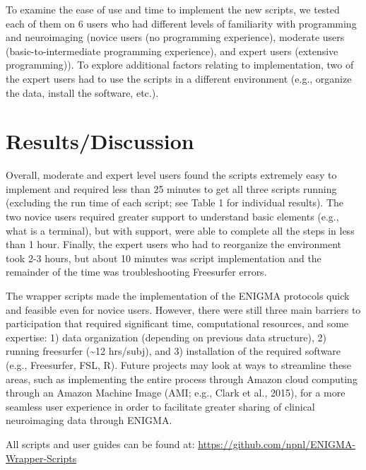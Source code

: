 \documentclass[twocolumn]{bmcart}%
\begin{document}
To examine the ease of use and time to implement the new scripts, we
tested each of them on 6 users who had different levels of familiarity
with programming and neuroimaging (novice users (no programming
experience), moderate users (basic-to-intermediate programming
experience), and expert users (extensive programming)). To explore
additional factors relating to implementation, two of the expert users
had to use the scripts in a different environment (e.g., organize the
data, install the software, etc.).

\section{Results/Discussion}\label{resultsdiscussion}

Overall, moderate and expert level users found the scripts extremely
easy to implement and required less than 25 minutes to get all three
scripts running (excluding the run time of each script; see Table 1 for
individual results). The two novice users required greater support to
understand basic elements (e.g., what is a terminal), but with support,
were able to complete all the steps in less than 1 hour. Finally, the
expert users who had to reorganize the environment took 2-3 hours, but
about 10 minutes was script implementation and the remainder of the time
was troubleshooting Freesurfer errors.

The wrapper scripts made the implementation of the ENIGMA protocols
quick and feasible even for novice users. However, there were still
three main barriers to participation that required significant time,
computational resources, and some expertise: 1) data organization
(depending on previous data structure), 2) running freesurfer
(\textasciitilde{}12 hrs/subj), and 3) installation of the required
software (e.g., Freesurfer, FSL, R). Future projects may look at ways to
streamline these areas, such as implementing the entire process through Amazon
cloud computing through an Amazon Machine Image (AMI; e.g., Clark et al., 2015),
for a more seamless user experience in order to facilitate greater sharing of
clinical neuroimaging data through ENIGMA.

All scripts and user guides can be found at:
\url{https://github.com/npnl/ENIGMA-Wrapper-Scripts}

\end{document}
